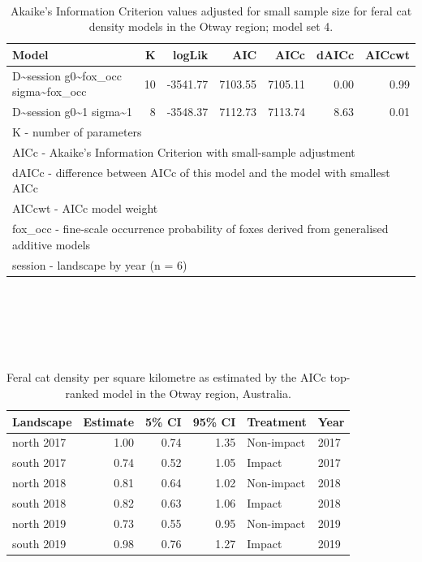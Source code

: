 \documentclass[11pt,a4paper,titlepage,twoside,openright]{style/unimelbthesis}
\begin{document}
\begin{mainmatter}
\newpage

\(~\)

\(~\)

\(~\)

\begingroup\fontsize{10}{12}\selectfont
\begin{longtable}[t]{lrrrrrr}
\caption{\label{tab:density-aic-o-4}Akaike's Information Criterion values adjusted for small sample size for feral cat density models in the Otway region; model set 4.}\\
\toprule
Model & K & logLik & AIC & AICc & dAICc & AICcwt\\
\midrule
D\textasciitilde{}session g0\textasciitilde{}fox\_occ sigma\textasciitilde{}fox\_occ & 10 & -3541.77 & 7103.55 & 7105.11 & 0.00 & 0.99\\
D\textasciitilde{}session g0\textasciitilde{}1 sigma\textasciitilde{}1 & 8 & -3548.37 & 7112.73 & 7113.74 & 8.63 & 0.01\\
\bottomrule
\multicolumn{7}{l}{\rule{0pt}{1em}K - number of parameters}\\
\multicolumn{7}{l}{\rule{0pt}{1em}AICc - Akaike's Information Criterion with small-sample adjustment}\\
\multicolumn{7}{l}{\rule{0pt}{1em}dAICc - difference between AICc of this model and the model with smallest AICc}\\
\multicolumn{7}{l}{\rule{0pt}{1em}AICcwt - AICc model weight}\\
\multicolumn{7}{l}{\rule{0pt}{1em}fox\_occ - fine-scale occurrence probability of foxes derived from generalised additive models}\\
\multicolumn{7}{l}{\rule{0pt}{1em}session - landscape by year (n = 6)}\\
\end{longtable}
\endgroup{}

\newpage

\(~\)

\(~\)

\(~\)

\begingroup\fontsize{10}{12}\selectfont
\begin{longtable}[t]{lrrrll}
\caption{\label{tab:density-aic-o-5}Feral cat density per square kilometre as estimated by the AICc top-ranked model in the Otway region, Australia.}\\
\toprule
Landscape & Estimate & 5\% CI & 95\% CI & Treatment & Year\\
\midrule
north 2017 & 1.00 & 0.74 & 1.35 & Non-impact & 2017\\
south 2017 & 0.74 & 0.52 & 1.05 & Impact & 2017\\
north 2018 & 0.81 & 0.64 & 1.02 & Non-impact & 2018\\
south 2018 & 0.82 & 0.63 & 1.06 & Impact & 2018\\
north 2019 & 0.73 & 0.55 & 0.95 & Non-impact & 2019\\
\addlinespace
south 2019 & 0.98 & 0.76 & 1.27 & Impact & 2019\\
\bottomrule
\end{longtable}
\endgroup{}


\end{mainmatter}
\end{document}
